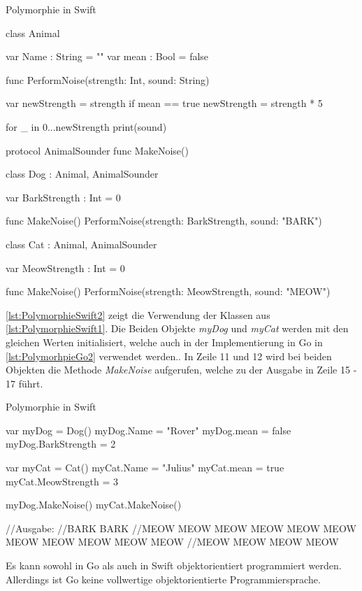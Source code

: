 \begin{listing}[H]
\caption{Polymorphie in Swift}
\label{lst:PolymorphieSwift1}
\begin{SwiftCode}
class Animal{
    var Name : String = ""
    var mean : Bool = false
	
    func PerformNoise(strength: Int, sound: String){
        var newStrength = strength
        if mean == true{
            newStrength = strength * 5
        }
		
        for _ in 0...newStrength{
            print(sound)
        }
    }
}

protocol AnimalSounder{
    func MakeNoise()
}

class Dog : Animal, AnimalSounder{
    var BarkStrength : Int = 0
	
    func MakeNoise() {
        PerformNoise(strength: BarkStrength, sound: "BARK")
    }
}

class Cat : Animal, AnimalSounder{
    var MeowStrength : Int = 0
	
    func MakeNoise() {
        PerformNoise(strength: MeowStrength, sound: "MEOW")
    }
}
\end{SwiftCode}
\end{listing}

\autoref{lst:PolymorphieSwift2} zeigt die Verwendung der Klassen aus \autoref{lst:PolymorphieSwift1}.
Die Beiden Objekte \textit{myDog} und \textit{myCat} werden mit den gleichen Werten initialisiert, welche auch in der Implementierung in Go in \autoref{lst:PolymorhpieGo2} verwendet werden..
In Zeile 11 und 12 wird bei beiden Objekten die Methode \textit{MakeNoise} aufgerufen, welche zu der Ausgabe in Zeile 15 - 17 führt. 

\begin{listing}[H]
\caption{Polymorphie in Swift}
\label{lst:PolymorphieSwift2}
\begin{SwiftCode}
var myDog = Dog()
myDog.Name = "Rover"
myDog.mean = false
myDog.BarkStrength = 2

var myCat = Cat()
myCat.Name = "Julius"
myCat.mean = true
myCat.MeowStrength = 3

myDog.MakeNoise()
myCat.MakeNoise()

//Ausgabe: 
//BARK BARK 
//MEOW MEOW MEOW MEOW MEOW MEOW MEOW MEOW MEOW MEOW MEOW 
//MEOW MEOW MEOW MEOW 
\end{SwiftCode}
\end{listing}

Es kann sowohl in Go als auch in Swift objektorientiert programmiert werden. 
Allerdings ist Go keine vollwertige objektorientierte Programmiersprache. 

